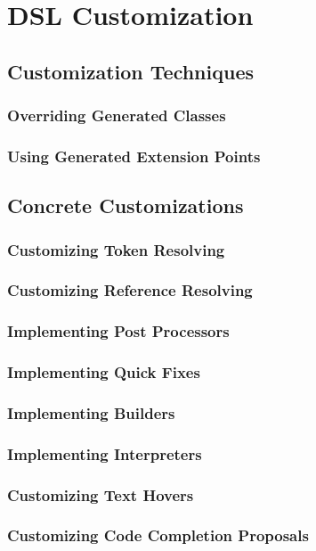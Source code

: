 \chapter{DSL Customization}

\section{Customization Techniques}

\subsection{Overriding Generated Classes}

\subsection{Using Generated Extension Points}



\section{Concrete Customizations}

\subsection{Customizing Token Resolving}
\label{sec:cust_token_resolving}

\subsection{Customizing Reference Resolving}
\label{sec:cust_reference_resolving}

\subsection{Implementing Post Processors}

\subsection{Implementing Quick Fixes}

\subsection{Implementing Builders}

\subsection{Implementing Interpreters}

\subsection{Customizing Text Hovers}

\subsection{Customizing Code Completion Proposals}

